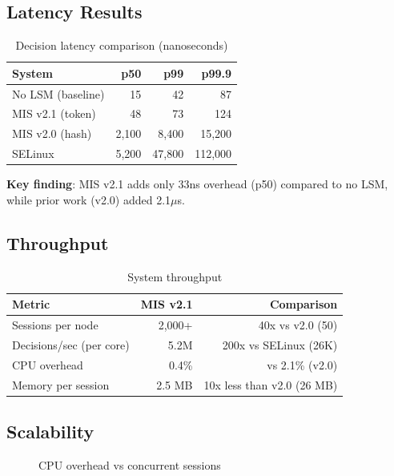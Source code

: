 \documentclass[11pt,a4paper]{article}
\begin{document}
\subsection{Latency Results}

\begin{table}[ht]
\centering
\caption{Decision latency comparison (nanoseconds)}
\begin{tabular}{lrrr}
\toprule
\textbf{System} & \textbf{p50} & \textbf{p99} & \textbf{p99.9} \\
\midrule
No LSM (baseline)   & 15 & 42 & 87 \\
MIS v2.1 (token)    & 48 & 73 & 124 \\
MIS v2.0 (hash)     & 2,100 & 8,400 & 15,200 \\
SELinux             & 5,200 & 47,800 & 112,000 \\
\bottomrule
\end{tabular}
\label{tab:latency}
\end{table}

\textbf{Key finding}: MIS v2.1 adds only 33ns overhead (p50) compared to no LSM, while prior work (v2.0) added 2.1$\mu$s.

\subsection{Throughput}

\begin{table}[ht]
\centering
\caption{System throughput}
\begin{tabular}{lrr}
\toprule
\textbf{Metric} & \textbf{MIS v2.1} & \textbf{Comparison} \\
\midrule
Sessions per node & 2,000+ & 40x vs v2.0 (50) \\
Decisions/sec (per core) & 5.2M & 200x vs SELinux (26K) \\
CPU overhead & 0.4\% & vs 2.1\% (v2.0) \\
Memory per session & 2.5 MB & 10x less than v2.0 (26 MB) \\
\bottomrule
\end{tabular}
\end{table}

\subsection{Scalability}

\begin{figure}[ht]
\centering
{}
\caption{CPU overhead vs concurrent sessions}
\end{figure}
\end{document}
